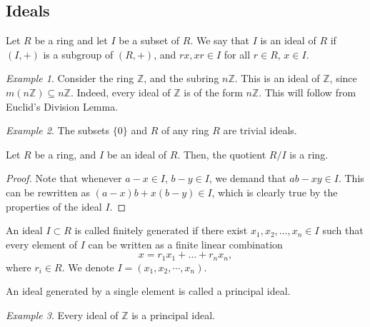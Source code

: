 \documentclass[11pt]{article}
\newcommand{\Z}{\mathbb{Z}}
\theoremstyle{definition}
\theoremstyle{remark}
\newtheorem*{example}{Example}
\numberwithin{equation}{section}
\begin{document}
    
    \subsection{Ideals}

    \begin{definition}
        Let $R$ be a ring and let $I$ be a subset of $R$. We say that $I$ is an ideal
        of $R$ if $(I, +)$ is a subgroup of $(R, +)$, and $rx, xr \in I$ for all $r
        \in R$, $x \in I$.
    \end{definition}

    \begin{example}
        Consider the ring $\Z$, and the subring $n\Z$. This is an ideal of $\Z$,
        since $m(n\Z) \subseteq n\Z$. Indeed, every ideal of $\Z$ is of the form
        $n\Z$. This will follow from Euclid's Division Lemma.
    \end{example}
    \begin{example}
        The subsets $\{0\}$ and $R$ of any ring $R$ are trivial ideals.
    \end{example}

    \begin{lemma}
        Let $R$ be a ring, and $I$ be an ideal of $R$. Then, the quotient $R/I$ is a
        ring.
    \end{lemma}
    \begin{proof}
        Note that whenever $a - x \in I$, $b - y \in I$, we demand that $ab - xy \in
        I$. This can be rewritten as $(a - x)b + x(b - y) \in I$, which is clearly
        true by the properties of the ideal $I$.
    \end{proof}

    \begin{definition}
        An ideal $I \subset R$ is called finitely generated if there exist $x_1, x_2,
        \dots, x_n \in I$ such that every element of $I$ can be written as a finite
        linear combination \[
            x = r_1x_1 + \dots + r_nx_n,
        \] where $r_i \in R$. We denote $I = (x_1, x_2, \cdots, x_n)$.
    \end{definition}

    \begin{definition}
        An ideal generated by a single element is called a principal ideal.
    \end{definition}
    \begin{example}
        Every ideal of $\Z$ is a principal ideal.
    \end{example}
\end{document}
